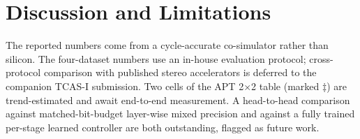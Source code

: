 \documentclass[lettersize,journal]{IEEEtran}
\begin{document}
\section{Discussion and Limitations}
\label{sec:discussion}

The reported numbers come from a cycle-accurate co-simulator rather than silicon. The four-dataset numbers use an in-house evaluation protocol; cross-protocol comparison with published stereo accelerators is deferred to the companion TCAS-I submission. Two cells of the APT 2$\times$2 table (marked $\ddagger$) are trend-estimated and await end-to-end measurement. A head-to-head comparison against matched-bit-budget layer-wise mixed precision and against a fully trained per-stage learned controller are both outstanding, flagged as future work.

\end{document}
